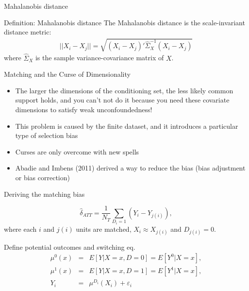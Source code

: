 \documentclass{beamer}
\begin{document}
\begin{frame}{Mahalanobis distance}
	
	\begin{block}{Definition: Mahalanobis distance}
	The Mahalanobis distance is the scale-invariant distance metric:
		\begin{eqnarray*}
		||X_i-X_j|| = \sqrt{ (X_i-X_j)'\widehat{\Sigma}_X^{-1}(X_i - X_j) }
		\end{eqnarray*}
	where $\widehat{\Sigma}_X$ is the sample variance-covariance matrix of $X$.
	\end{block}


\end{frame}



\begin{frame}{Matching and the Curse of Dimensionality}
	
\begin{itemize}
\item The larger the dimensions of the conditioning set, the less likely common support holds, and you can't not do it because you need these covariate dimensions to satisfy weak unconfoundedness!
\item This problem is caused by the finite dataset, and it introduces a particular type of selection bias
\item Curses are only overcome with new spells  
\item Abadie and Imbens (2011) derived a way to reduce the bias (bias adjustment or bias correction)
\end{itemize}

\end{frame}


\begin{frame}{Deriving the matching bias}
	
  \vspace{-5mm}
  $$
		\widehat{\delta}_{ATT} = \frac{1}{N_T} \sum_{D_i=1} (Y_i - Y_{j(i)}),
  $$
  where each $i$ and $j(i)$ units are matched, $X_i \approx X_{j(i)}$ and $D_{j(i)}=0$. 
	 
  \bigskip
  Define potential outcomes and switching eq.
		\begin{eqnarray*}
      \mu^0(x) &=& E[Y | X=x,D=0] = E[Y^0 | X=x],\\
      \mu^1(x) &=& E[Y | X=x,D=1] = E[Y^1 | X=x],\\
      Y_i &=& \mu^{D_i}(X_i) + \varepsilon_i
		\end{eqnarray*}
\end{frame}
\end{document}

